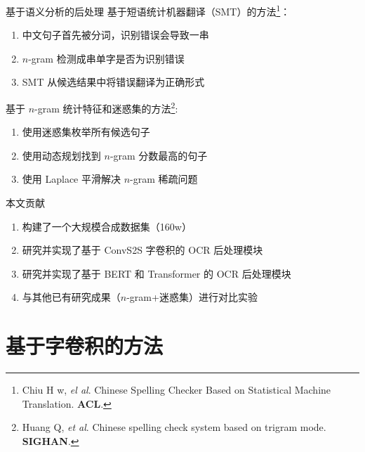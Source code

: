 \begin{frame}[c]{基于语义分析的后处理}
	基于短语统计机器翻译（SMT）的方法\footnote{Chiu H w, \textit{el al}. Chinese Spelling Checker Based on Statistical
		Machine Translation. \textbf{ACL}.}：
	\begin{enumerate}
		\item 中文句子首先被分词，识别错误会导致一串
		\item $n$-gram 检测成串单字是否为识别错误
		\item SMT 从候选结果中将错误翻译为正确形式
	\end{enumerate}

	\vspace{1.0em}
	
	基于 $n$-­gram 统计特征和迷惑集的方法\footnote{Huang Q, \textit{et al}. Chinese spelling check system based on tri­gram mode. \textbf{SIGHAN}.}:
	\begin{enumerate}
		\item 使用迷惑集枚举所有候选句子
		\item 使用动态规划找到 $n$-gram 分数最高的句子
		\item 使用 Laplace 平滑解决 $n$-gram 稀疏问题
	\end{enumerate}

\end{frame}

\begin{frame}[c]{本文贡献}
	\begin{enumerate}
		\item 构建了一个大规模合成数据集（160w）
		\item 研究并实现了基于 ConvS2S 字卷积的 OCR 后处理模块
		\item 研究并实现了基于 BERT 和 Transformer 的 OCR 后处理模块
		\item 与其他已有研究成果（$n$-­gram+迷惑集）进行对比实验
	\end{enumerate}
\end{frame}

\section{基于字卷积的方法}

